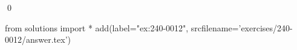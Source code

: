 
\begin{ex} 
  \label{ex:240-0012}
  
  \qed
\end{ex} 
\begin{python0}
from solutions import *
add(label="ex:240-0012",
    srcfilename='exercises/240-0012/answer.tex') 
\end{python0}
